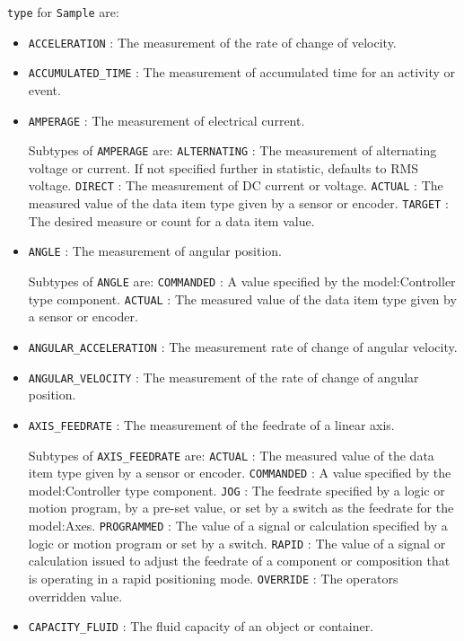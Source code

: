  \texttt{type} for \texttt{Sample} are:
\begin{itemize}

\item \texttt{ACCELERATION} : The measurement of the rate of change of velocity. 

\item \texttt{ACCUMULATED_TIME} : The measurement of accumulated time for an activity or event. 

\item \texttt{AMPERAGE} : The measurement of electrical current. 

Subtypes of \texttt{AMPERAGE} are: 
\newline\tab \texttt{ALTERNATING} : The measurement of alternating voltage or current.   If not specified further in statistic, defaults to RMS voltage.  
\newline\tab \texttt{DIRECT} : The measurement of DC current or voltage. 
\newline\tab \texttt{ACTUAL} : The measured value of the data item type given by a sensor or encoder. 
\newline\tab \texttt{TARGET} : The desired measure or count for a data item value. 
\item \texttt{ANGLE} : The measurement of angular position. 

Subtypes of \texttt{ANGLE} are: 
\newline\tab \texttt{COMMANDED} : A value specified by the {model:Controller} type component. 
\newline\tab \texttt{ACTUAL} : The measured value of the data item type given by a sensor or encoder. 
\item \texttt{ANGULAR_ACCELERATION} : The measurement rate of change of angular velocity. 

\item \texttt{ANGULAR_VELOCITY} : The measurement of the rate of change of angular position. 

\item \texttt{AXIS_FEEDRATE} : The measurement of the feedrate of a linear axis. 

Subtypes of \texttt{AXIS_FEEDRATE} are: 
\newline\tab \texttt{ACTUAL} : The measured value of the data item type given by a sensor or encoder. 
\newline\tab \texttt{COMMANDED} : A value specified by the {model:Controller} type component. 
\newline\tab \texttt{JOG} : The feedrate specified by a logic or motion program, by a pre-set value, or set by a switch as the feedrate for the {model:Axes}.  
\newline\tab \texttt{PROGRAMMED} : The value of a signal or calculation specified by a logic or motion program or set by a switch. 
\newline\tab \texttt{RAPID} : The value of a signal or calculation issued to adjust the feedrate of a component or composition that is operating in a rapid positioning mode. 
\newline\tab \texttt{OVERRIDE} : The operators overridden value. 
\item \texttt{CAPACITY_FLUID} : The fluid capacity of an object or container. 


\end{itemize}
